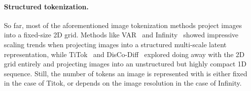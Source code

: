 \paragraph{Structured tokenization.} 
So far, most of the aforementioned image tokenization methods project images into a fixed-size 2D grid. Methods like VAR~\cite{tian2024var} and Infinity~\cite{Han2024Infinity} showed impressive scaling trends when projecting images into a structured multi-scale latent representation, while TiTok~\cite{yu2024titok} and DisCo-Diff~\cite{Xu2024DisCoDiff} explored doing away with the 2D grid entirely and projecting images into an unstructured but highly compact 1D sequence. Still, the number of tokens an image is represented with is either fixed in the case of Titok, or depends on the image resolution in the case of Infinity.

